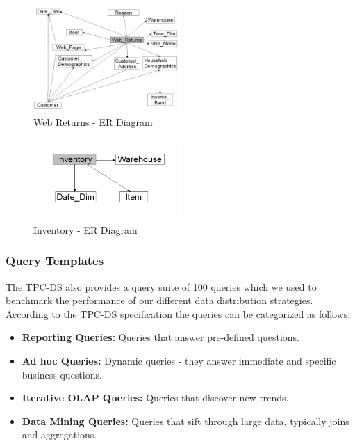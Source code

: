 \documentclass[conference]{IEEEtran}
\begin{document}
\begin{figure}[h]
	\centering
	\includegraphics[width=0.5\textwidth]{images/ER_Diagrams/Web Returns - ER Diagram.png}
	\caption{Web Returns - ER Diagram}
	\label{fig:web_returns_er_diagram}
\end{figure}

\begin{figure}[h]
	\centering
	\includegraphics[width=0.5\textwidth]{images/ER_Diagrams/Inventory - ER Diagram.png}
	\caption{Inventory - ER Diagram}
	\label{fig:inventory_er_diagram}
\end{figure}

\subsubsection{Query Templates}

The TPC-DS also provides a query suite of 100 queries which we used to benchmark the performance of our different data distribution strategies. According to the TPC-DS specification \cite{b10} the queries can be categorized as follows:

\begin{itemize}
	\item \textbf{Reporting Queries:} Queries that answer pre-defined questions.
	\item \textbf{Ad hoc Queries:}  Dynamic queries - they answer immediate and specific business questions.
	\item \textbf{Iterative OLAP Queries:}  Queries that discover new trends.
	\item \textbf{Data Mining Queries:}  Queries that sift through large data, typically joins and aggregations.
\end{itemize}
\end{document}
